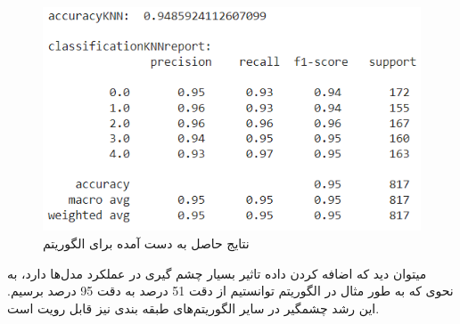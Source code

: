 \begin{figure}[h!]
	\centering
	\includegraphics[width=1\linewidth]{images/knn_classification_results_augment.PNG}
	\caption{نتایج حاصل به دست آمده برای الگوریتم }
	\label{fig:knn_classification_results_augment}
\end{figure}

میتوان دید که اضافه کردن داده تاثیر بسیار چشم گیری در عملکرد مدل‌ها دارد، به نحوی که به طور مثال در 
الگوریتم  توانستیم از دقت 51 درصد به دقت 95 درصد برسیم.
این رشد چشمگیر در سایر الگوریتم‌های طبقه بندی نیز قابل رویت است.
